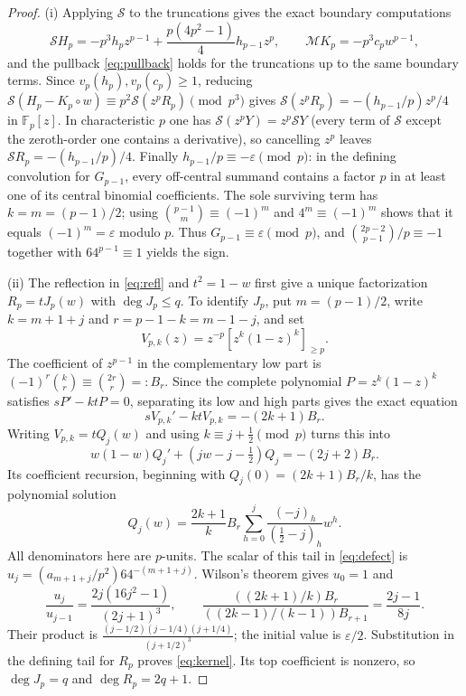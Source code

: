 \documentclass[11pt]{amsart}
\theoremstyle{definition}
\theoremstyle{remark}
\newcommand{\Fp}{\mathbb{F}_p}
\begin{document}
\begin{proof}
(i) Applying $\mathcal S$ to the truncations gives the exact boundary
computations
\[
\mathcal SH_p=-p^3h_pz^{p-1}+\frac{p(4p^2-1)}{4}h_{p-1}z^p,
\qquad
\mathcal MK_p=-p^3c_pw^{p-1},
\]
and the pullback \eqref{eq:pullback} holds for the truncations up to the
same boundary terms. Since $v_p(h_p),v_p(c_p)\ge1$, reducing
$\mathcal S(H_p-K_p\circ w)\equiv p^2\mathcal S(z^pR_p)\pmod{p^3}$
gives $\mathcal S(z^pR_p)=-(h_{p-1}/p)z^p/4$ in $\Fp[z]$. In
characteristic $p$ one has $\mathcal S(z^pY)=z^p\mathcal SY$ (every term
of $\mathcal S$ except the zeroth-order one contains a derivative), so
cancelling $z^p$ leaves $\mathcal SR_p=-(h_{p-1}/p)/4$. Finally
$h_{p-1}/p\equiv-\varepsilon\pmod p$: in the defining convolution for
$G_{p-1}$, every off-central summand contains a factor $p$ in at least
one of its central binomial coefficients.  The sole surviving term has
$k=m=(p-1)/2$; using
$\binom{p-1}{m}\equiv(-1)^m$ and $4^m\equiv(-1)^m$ shows that it equals
$(-1)^m=\varepsilon$ modulo $p$.  Thus
$G_{p-1}\equiv\varepsilon\pmod p$, and
$\binom{2p-2}{p-1}/p\equiv-1$ together with $64^{p-1}\equiv1$ yields
the sign.

 (ii) The reflection in \eqref{eq:refl} and $t^2=1-w$ first give a
unique factorization $R_p=tJ_p(w)$ with $\deg J_p\le q$.  To identify
$J_p$, put $m=(p-1)/2$, write $k=m+1+j$ and $r=p-1-k=m-1-j$, and set
\[
 V_{p,k}(z)=z^{-p}[z^k(1-z)^k]_{\ge p}.
\]
The coefficient of $z^{p-1}$ in the complementary low part is
$(-1)^r\binom kr\equiv\binom{2r}{r}=:B_r$.  Since the complete
polynomial $P=z^k(1-z)^k$ satisfies $sP'-ktP=0$, separating its low and
high parts gives the exact equation
\[
 sV_{p,k}'-ktV_{p,k}=-(2k+1)B_r.                 \tag{5.3}
\]
Writing $V_{p,k}=tQ_j(w)$ and using $k\equiv j+\frac12\pmod p$ turns
this into
\[
 w(1-w)Q_j'+(jw-j-\tfrac12)Q_j=-(2j+2)B_r.
\]
Its coefficient recursion, beginning with
$Q_j(0)=(2k+1)B_r/k$, has the polynomial solution
\[
 Q_j(w)=\frac{2k+1}{k}B_r
 \sum_{h=0}^j\frac{(-j)_h}{(\frac12-j)_h}w^h .  \tag{5.4}
\]
All denominators here are $p$-units.  The scalar of this tail in
\eqref{eq:defect} is
$u_j=(a_{m+1+j}/p^2)64^{-(m+1+j)}$.  Wilson's theorem gives
$u_0=1$ and
\[
 \frac{u_j}{u_{j-1}}=
 \frac{2j(16j^2-1)}{(2j+1)^3},\qquad
 \frac{((2k+1)/k)B_r}{((2k-1)/(k-1))B_{r+1}}
 =\frac{2j-1}{8j}.
\]
Their product is
$\frac{(j-1/2)(j-1/4)(j+1/4)}{(j+1/2)^3}$; the initial value is
$\varepsilon/2$.  Substitution in the defining tail for $R_p$ proves
\eqref{eq:kernel}.  Its top coefficient is nonzero, so
$\deg J_p=q$ and $\deg R_p=2q+1$.


\end{proof}
\end{document}
